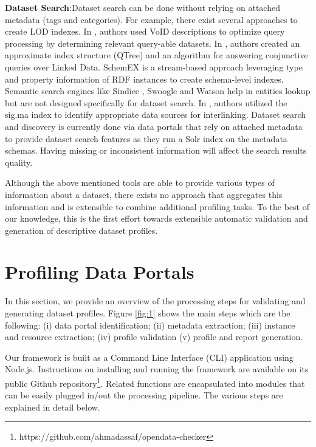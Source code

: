 \documentclass[runningheads,a4paper]{llncs}
\begin{document}
\textbf{Dataset Search}:Dataset search can be done without relying on attached metadata (tags and categories). For example, there exist several approaches to create LOD indexes. In \cite{Alexander:LDOW09}, authors used VoID descriptions to optimize query processing by determining relevant query-able datasets. In \cite{Harth:2010:DSO:1772690.1772733}, authors created an approximate index structure (QTree) and an algorithm for answering conjunctive queries over Linked Data. SchemEX \cite{Konrath:2012:SEC:2399444.2399563} is a stream-based approach leveraging type and property information of RDF instances to create schema-level indexes.\\
Semantic search engines like Sindice \cite{Delbru2010a}, Swoogle \cite{Ding2004} and Watson \cite{d'Aquin:2011:WMS:2019470.2019476} help in entities lookup but are not designed specifically for dataset search. In \cite{whatShouldILinkTo}, authors utilized the sig.ma index \cite{sig.ma} to identify appropriate data sources for interlinking. Dataset search and discovery is currently done via data portals that rely on attached metadata to provide dataset search features as they run a Solr index on the metadata schemas. Having missing or inconsistent information will affect the search results quality.

Although the above mentioned tools are able to provide various types of information about a dataset, there exists no approach that aggregates this information and is extensible to combine additional profiling tasks. To the best of our knowledge, this is the first effort towards extensible automatic validation and generation of descriptive dataset profiles.


\section{Profiling Data Portals}
\label{sec:framework}

In this section, we provide an overview of the processing steps for validating and generating dataset profiles. Figure \ref{fig:1} shows the main steps which are the following: (i) data portal identification; (ii) metadata extraction; (iii) instance and resource extraction; (iv) profile validation (v) profile and report generation.

Our framework is built as a Command Line Interface (CLI) application using Node.js. Instructions on installing and running the framework are available on its public Github repository\footnote{https://github.com/ahmadassaf/opendata-checker}. Related functions are encapsulated into modules that can be easily plugged in/out the processing pipeline. The various steps are explained in detail below.
\end{document}
